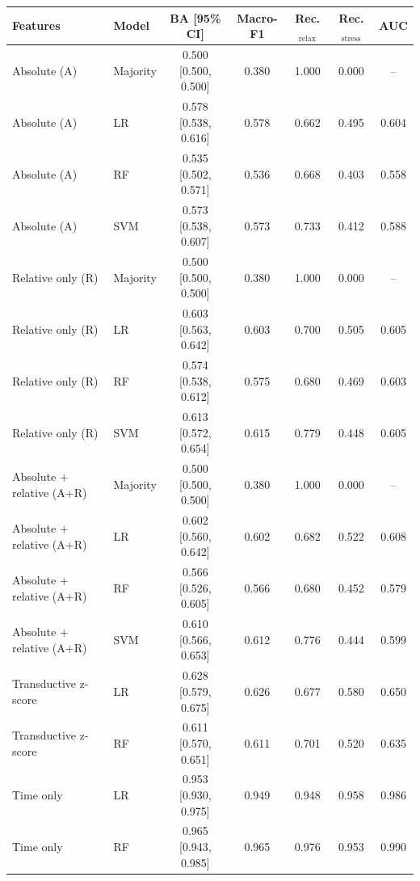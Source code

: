 \begin{tabular}{@{}llccccc@{}}
\toprule
Features & Model & BA [95\% CI] & Macro-F1 & Rec.$_\mathrm{relax}$ & Rec.$_\mathrm{stress}$ & AUC \\
\midrule
Absolute (A) & Majority & 0.500 [0.500, 0.500] & 0.380 & 1.000 & 0.000 & -- \\
Absolute (A) & LR & 0.578 [0.538, 0.616] & 0.578 & 0.662 & 0.495 & 0.604 \\
Absolute (A) & RF & 0.535 [0.502, 0.571] & 0.536 & 0.668 & 0.403 & 0.558 \\
Absolute (A) & SVM & 0.573 [0.538, 0.607] & 0.573 & 0.733 & 0.412 & 0.588 \\
\midrule
Relative only (R) & Majority & 0.500 [0.500, 0.500] & 0.380 & 1.000 & 0.000 & -- \\
Relative only (R) & LR & 0.603 [0.563, 0.642] & 0.603 & 0.700 & 0.505 & 0.605 \\
Relative only (R) & RF & 0.574 [0.538, 0.612] & 0.575 & 0.680 & 0.469 & 0.603 \\
Relative only (R) & SVM & 0.613 [0.572, 0.654] & 0.615 & 0.779 & 0.448 & 0.605 \\
\midrule
Absolute + relative (A+R) & Majority & 0.500 [0.500, 0.500] & 0.380 & 1.000 & 0.000 & -- \\
Absolute + relative (A+R) & LR & 0.602 [0.560, 0.642] & 0.602 & 0.682 & 0.522 & 0.608 \\
Absolute + relative (A+R) & RF & 0.566 [0.526, 0.605] & 0.566 & 0.680 & 0.452 & 0.579 \\
Absolute + relative (A+R) & SVM & 0.610 [0.566, 0.653] & 0.612 & 0.776 & 0.444 & 0.599 \\
\midrule
Transductive z-score & LR & 0.628 [0.579, 0.675] & 0.626 & 0.677 & 0.580 & 0.650 \\
Transductive z-score & RF & 0.611 [0.570, 0.651] & 0.611 & 0.701 & 0.520 & 0.635 \\
\midrule
Time only & LR & 0.953 [0.930, 0.975] & 0.949 & 0.948 & 0.958 & 0.986 \\
Time only & RF & 0.965 [0.943, 0.985] & 0.965 & 0.976 & 0.953 & 0.990 \\
\bottomrule
\end{tabular}
